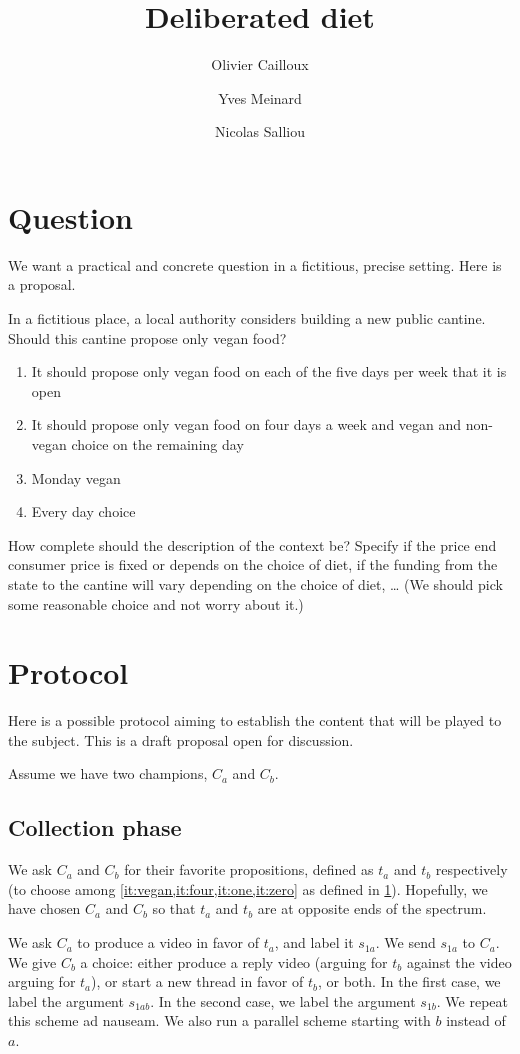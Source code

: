\documentclass[version=3.21, pagesize, twoside=off, bibliography=totoc, DIV=calc, fontsize=12pt, a4paper]{scrartcl}
\title{Deliberated diet}
\author{Olivier Cailloux}
\author{Yves Meinard}
\affil{Université Paris-Dauphine, PSL Research University, CNRS, LAMSADE, 75016 PARIS, FRANCE}
\author{Nicolas Salliou}
\affil{Affiliation}
\begin{document}
\maketitle

\section{Question}
\label{sec:question}
We want a practical and concrete question in a fictitious, precise setting. Here is a proposal.

In a fictitious place, a local authority considers building a new public cantine. Should this cantine propose only vegan food?
\begin{enumerate}
	\item \label{it:vegan} It should propose only vegan food on each of the five days per week that it is open
	\item \label{it:four} It should propose only vegan food on four days a week and vegan and non-vegan choice on the remaining day
	\item \label{it:one} Monday vegan
	\item \label{it:zero} Every day choice
\end{enumerate}
How complete should the description of the context be? Specify if the price end consumer price is fixed or depends on the choice of diet, if the funding from the state to the cantine will vary depending on the choice of diet, … (We should pick some reasonable choice and not worry about it.)

\section{Protocol}
\label{sec:prot}
Here is a possible protocol aiming to establish the content that will be played to the subject. This is a draft proposal open for discussion.

Assume we have two champions, $C_a$ and $C_b$.

\subsection{Collection phase}
We ask $C_a$ and $C_b$ for their favorite propositions, defined as $t_a$ and $t_b$ respectively (to choose among \cref{it:vegan,it:four,it:one,it:zero} as defined in \cref{sec:question}). Hopefully, we have chosen $C_a$ and $C_b$ so that $t_a$ and $t_b$ are at opposite ends of the spectrum.

We ask $C_a$ to produce a video in favor of $t_a$, and label it $s_{1a}$. We send $s_{1a}$ to $C_a$. We give $C_b$ a choice: either produce a reply video (arguing for $t_b$ against the video arguing for $t_a$), or start a new thread in favor of $t_b$, or both. In the first case, we label the argument $s_{1ab}$. In the second case, we label the argument $s_{1b}$. We repeat this scheme ad nauseam. We also run a parallel scheme starting with $b$ instead of $a$.
\end{document}

